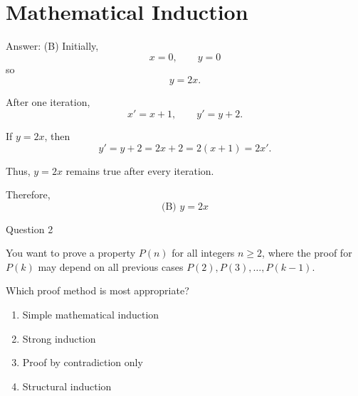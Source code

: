 \documentclass[aspectratio=169,11pt]{beamer}
\begin{document}
\section{Mathematical Induction}

\begin{frame}

\begin{block}{Answer: (B)}
Initially,
$$
x=0,\qquad y=0
$$
so
$$
y=2x.
$$

After one iteration,
$$
x'=x+1,\qquad y'=y+2.
$$

If $y=2x$, then
$$
y'=y+2
=2x+2
=2(x+1)
=2x'.
$$

Thus, $y=2x$ remains true after every iteration.

Therefore,
$$
\boxed{\text{(B) }y=2x}
$$
\end{block}

\end{frame}
\begin{frame}{Question 2}

You want to prove a property $P(n)$ for all integers $n\geq2$,
where the proof for $P(k)$ may depend on all previous cases
$P(2),P(3),\ldots,P(k-1)$.

Which proof method is most appropriate?

\begin{enumerate}
    \item[(A)] Simple mathematical induction
    \item[(B)] Strong induction
    \item[(C)] Proof by contradiction only
    \item[(D)] Structural induction
\end{enumerate}

\end{frame}
\end{document}
